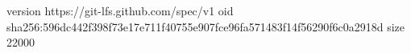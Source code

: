version https://git-lfs.github.com/spec/v1
oid sha256:596dc442f398f73e17e711f40755e907fce96fa571483f14f56290f6c0a2918d
size 22000
